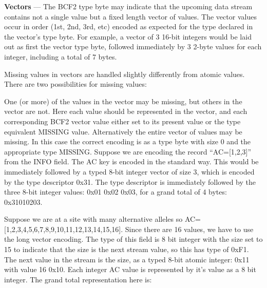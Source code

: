 \documentclass[8pt]{article}
\begin{document}
%

\vspace{0.3cm}

\textbf{Vectors} --- The BCF2 type byte may indicate that the upcoming data stream contains not a single value but a fixed length vector of values.
The vector values occur in order (1st, 2nd, 3rd, etc) encoded as expected for the type declared in the vector's type byte.
For example, a vector of 3 16-bit integers would be laid out as first the vector type byte, followed immediately by 3 2-byte values for each integer, including a total of 7 bytes.

Missing values in vectors are handled slightly differently from atomic values.
There are two possibilities for missing values:

One (or more) of the values in the vector may be missing, but others in the vector are not.
Here each value should be represented in the vector, and each corresponding BCF2 vector value either set to its present value or the type equivalent MISSING value.
Alternatively the entire vector of values may be missing.
In this case the correct encoding is as a type byte with size 0 and the appropriate type MISSING.
Suppose we are encoding the record ``AC=[1,2,3]'' from the INFO field.
The AC key is encoded in the standard way.
This would be immediately followed by a typed 8-bit integer vector of size 3, which is encoded by the type descriptor 0x31.
The type descriptor is immediately followed by the three 8-bit integer values: 0x01 0x02 0x03, for a grand total of 4 bytes: 0x31010203.

Suppose we are at a site with many alternative alleles so AC=[1,2,3,4,5,6,7,8,9,10,11,12,13,14,15,16].
Since there are 16 values, we have to use the long vector encoding.
The type of this field is 8 bit integer with the size set to 15 to indicate that the size is the next stream value, so this has type of 0xF1.
The next value in the stream is the size, as a typed 8-bit atomic integer: 0x11 with value 16 0x10.
Each integer AC value is represented by it's value as a 8 bit integer.
The grand total representation here is:
\end{document}
